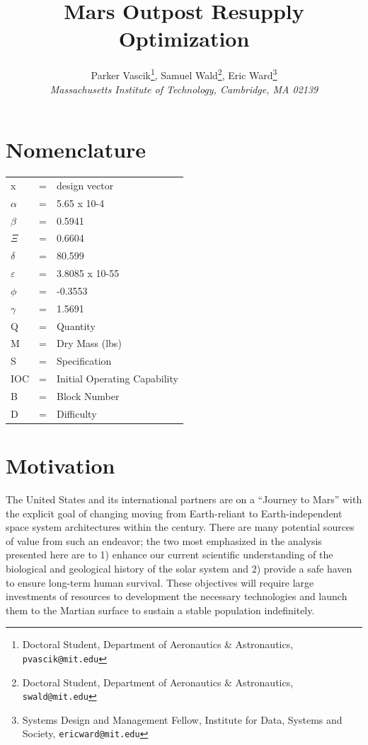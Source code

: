 \documentclass[]{aiaa-pretty}
\author[Vascik, Wald, and Ward]{ %
Parker Vascik\thanks{Doctoral Student, Department of Aeronautics \& Astronautics, \texttt{pvascik@mit.edu}},
Samuel Wald\thanks{Doctoral Student, Department of Aeronautics \& Astronautics, \texttt{swald@mit.edu}},
Eric Ward\thanks{Systems Design and Management Fellow, Institute for Data, Systems and Society, \texttt{ericward@mit.edu}}\\
\textit{Massachusetts Institute of Technology, Cambridge, MA 02139}}
\title{Mars Outpost Resupply Optimization}
\begin{document}
\maketitle

\section{Nomenclature}
\begin{table}[]
\centering
\label{tab:Nom}
\begin{tabular}{lll}
x   & = & design vector                \\
\( \alpha \)   & = & 5.65 x 10-4                  \\
\( \beta \)   & = & 0.5941                       \\
\( \Xi \)   & = & 0.6604                       \\
\( \delta \)   & = & 80.599                       \\
\( \varepsilon \)   & = & 3.8085 x 10-55               \\
\( \phi \)   & = & -0.3553                      \\
\( \gamma \)   & = & 1.5691                       \\
Q   & = & Quantity                     \\
M   & = & Dry Mass (lbs)               \\
S   & = & Specification                \\
IOC & = & Initial Operating Capability \\
B   & = & Block Number                 \\
D   & = & Difficulty                  
\end{tabular}
\end{table}


\section{Motivation}
\label{sec:Motivation}
The United States and its international partners are on a “Journey to Mars” with the explicit goal of changing moving from Earth-reliant to Earth-independent space system architectures within the century. \cite{craig2015pioneering} There are many potential sources of value from such an endeavor; the two most emphasized in the analysis presented here are to 1) enhance our current scientific understanding of the biological and geological history of the solar system and 2) provide a safe haven to ensure long-term human survival. \cite{NRC2014} These objectives will require large investments of resources to development the necessary technologies and launch them to the Martian surface to sustain a stable population indefinitely. 
\end{document}
